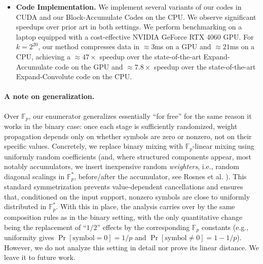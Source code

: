 \begin{itemize}
    \cite{spielman} proved that when each $\G_i$ has ``constant recursive memory'' such as the accumulator, then a turbo code with a single permutation ($t=2$) must have sublinear minimum distance. On the other hand, two permutations ($t=3$) are sufficient. They focused on the RAA code with rate 1/4. However, our Block-Accumulate codes can achieve full GV minimum distance at rate 1/2 while still being linear time. We demonstrate for concrete parameters we achieve the GV bound while asymptotically we show linear minimum distance assuming $\G_1$ is instantiated with at least constant distance of 5. 

    \item \textbf{Code Implementation.} We implement several variants of our codes in CUDA and our Block-Accumulate Codes on the CPU. We observe significant speedups over prior art in both settings. We perform benchmarking on a laptop equipped with a cost-effective NVIDIA GeForce RTX 4060 GPU. For $k = 2^{20}$, our method compresses data in $\approx3$ms on a GPU and $\approx21$ms on a CPU, achieving a $\approx47\times$ speedup over the state-of-the-art Expand-Accumulate code \cite{EA} on the GPU and $\approx7.8\times$ speedup over the state-of-the-art Expand-Convolute code \cite{EC} on the CPU.

\end{itemize}


\paragraph{A note on generalization.}
Over $\mathbb{F}_p$, our enumerator generalizes essentially ``for free'' for the same reason it works in the binary case: once each stage is sufficiently randomized, weight propagation depends only on whether symbols are zero or nonzero, not on their specific values. Concretely, we replace binary mixing with $\mathbb{F}_p$-linear mixing using uniformly random coefficients (and, where structured components appear, most notably accumulators, we insert inexpensive random \emph{weighters}, i.e., random diagonal scalings in $\mathbb{F}_p^*$, before/after the accumulator, see Rosnes et al. \cite{rosnes2011analysis}). This standard symmetrization prevents value-dependent cancellations and ensures that, conditioned on the input support, nonzero symbols are close to uniformly distributed in $\mathbb{F}_p^*$. With this in place, the analysis carries over by the same composition rules as in the binary setting, with the only quantitative change being the replacement of ``$1/2$'' effects by the corresponding $\mathbb{F}_p$ constants (e.g., uniformity gives $\Pr[\text{symbol}=0]=1/p$ and $\Pr[\text{symbol}\neq 0]=1-1/p$). However, we do not analyze this setting in detail nor prove its linear distance. We leave it to future work.
